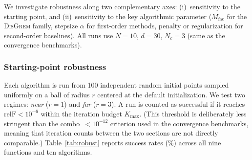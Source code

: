 \documentclass[review,onefignum,onetabnum]{siamart171218}
\begin{document}
	We investigate robustness along two complementary axes:
	(i)~sensitivity to the starting point, and
	(ii)~sensitivity to the key algorithmic parameter ($M_{\mathrm{fac}}$ for
	the \textsc{DisGrem} family, stepsize $\alpha$ for first-order methods,
	penalty or regularization for second-order baselines).
	All runs use $N{=}10$, $d{=}30$, $N_c{=}3$ (same as the convergence
	benchmarks).
	
	\subsubsection{Starting-point robustness}
	
	Each algorithm is run from 100 independent random initial points
	sampled uniformly on a ball of radius $r$ centered at the default
	initialization.
	We test two regimes: \textit{near} ($r{=}1$) and \textit{far}
	($r{=}3$).
	A run is counted as successful if it reaches $\mathrm{relF}<10^{-6}$
	within the iteration budget $K_{\max}$.
	(This threshold is deliberately less stringent than the combo~$<10^{-12}$
	criterion used in the convergence benchmarks, meaning that iteration counts
	between the two sections are not directly comparable.)
	Table~\ref{tab:robust} reports
	success rates (\%) across all nine functions and ten algorithms.
	
\end{document}

